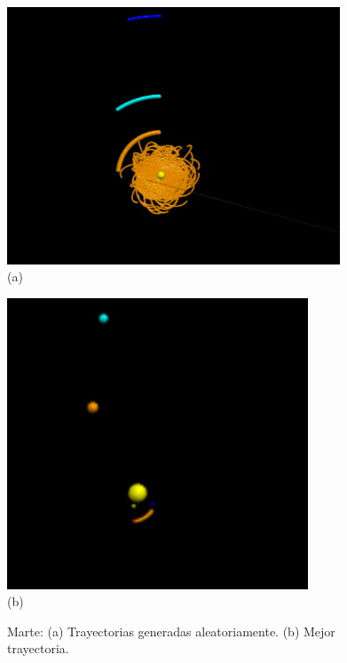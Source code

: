 \documentclass[12pt,letterpaper]{article}
\begin{document}
\begin{figure}[H]
\centering
  \begin{minipage}{0.3\textwidth}
    \centering
    \includegraphics[width=0.885\textwidth]{marte}\\
    {\small (a)} 
  \end{minipage}%
  \hspace{1mm}
  \begin{minipage}{0.3\textwidth}
    \centering
    \includegraphics[width=0.8\textwidth]{marteop}\\
    {\small (b)} 
  \end{minipage}
  \caption{Marte: (a) Trayectorias generadas aleatoriamente. (b) Mejor trayectoria.}
  \label{fig:marte}
\end{figure}
\end{document}
